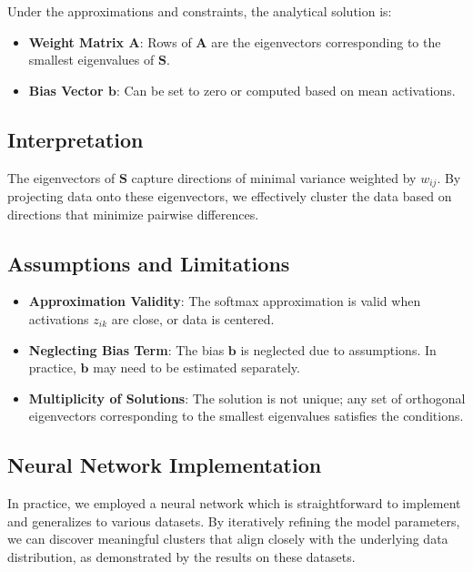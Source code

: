 \documentclass[journal]{IEEEtran}
\begin{document}
Under the approximations and constraints, the analytical solution is:
\begin{itemize}
    \item \textbf{Weight Matrix \( \mathbf{A} \)}: Rows of \( \mathbf{A} \) are the eigenvectors corresponding to the smallest eigenvalues of \( \mathbf{S} \).
    \item \textbf{Bias Vector \( \mathbf{b} \)}: Can be set to zero or computed based on mean activations.
\end{itemize}

\subsection{Interpretation}

The eigenvectors of \( \mathbf{S} \) capture directions of minimal variance weighted by \( w_{ij} \). By projecting data onto these eigenvectors, we effectively cluster the data based on directions that minimize pairwise differences.

\subsection{Assumptions and Limitations}

\begin{itemize}
    \item \textbf{Approximation Validity}: The softmax approximation is valid when activations \( z_{ik} \) are close, or data is centered.
    \item \textbf{Neglecting Bias Term}: The bias \( \mathbf{b} \) is neglected due to assumptions. In practice, \( \mathbf{b} \) may need to be estimated separately.
    \item \textbf{Multiplicity of Solutions}: The solution is not unique; any set of orthogonal eigenvectors corresponding to the smallest eigenvalues satisfies the conditions.
\end{itemize}

\subsection{Neural Network Implementation}

In practice, we employed a neural network which is straightforward to implement and generalizes to various datasets. By iteratively refining the model parameters, we can discover meaningful clusters that align closely with the underlying data distribution, as demonstrated by the results on these datasets.
\end{document}

